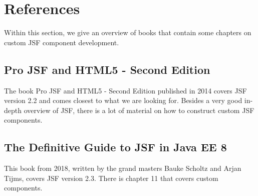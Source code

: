 %

\chapter*{References}
Within this section, we give an overview of books that contain some chapters on custom JSF component development.

\section*{Pro JSF and HTML5 - Second Edition}
The book Pro JSF and HTML5 - Second Edition \cite{wadia2014pro} published in 2014 covers JSF version 2.2 and comes closest to what we are looking for.
Besides a very good in-depth overview of JSF, there is a lot of material on how to construct custom JSF components.

\section*{The Definitive Guide to JSF in Java EE 8}
This book \cite{Scholtz2018TheDG} from 2018, written by the grand masters Bauke Scholtz and Arjan Tijms, covers JSF version 2.3.
There is chapter 11 that covers custom components.



